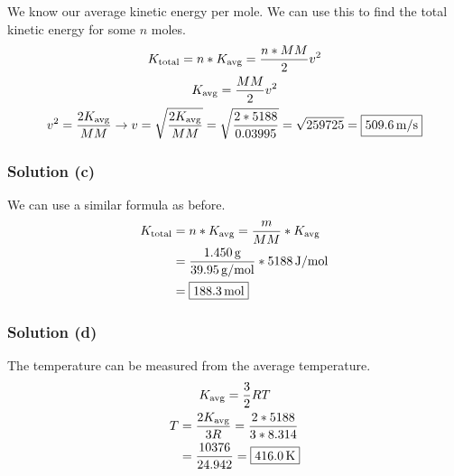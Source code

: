 \documentclass[10pt]{article}
\begin{document}
                We know our average kinetic energy per mole.
                We can use this to find the total kinetic energy for some $n$ moles.
                \begin{gather}
                    K_{\rm total}   =   n * K_{\rm avg}
                        =   \frac{n * MM}{2}v^2\\
                    K_{\rm avg} =   \frac{MM}{2}v^2\\
                    v^2 =   \frac{2K_{\rm avg}}{MM}   \to
                    v   =   \sqrt{\frac{2K_{\rm avg}}{MM}}
                        =   \sqrt{\frac{2 * 5188}{0.03995}}
                        =   \sqrt{259725}
                        =   \boxed{509.6\,\unit{\meter/\second}}
                \end{gather}
            
            \subsubsection{Solution (c)}
                We can use a similar formula as before. 
                \begin{align}
                    K_{\rm total}   &=  n * K_{\rm avg}
                        =   \frac{m}{MM} * K_{\rm avg}\\
                        &=  \frac{1.450\,\unit{\gram}}{39.95\,\unit{\gram/\mole}} * 5188\,\unit{\joule/\mole}\\
                        &=  \boxed{188.3\,\unit{\mole}}
                \end{align}

            \subsubsection{Solution (d)}
                The temperature can be measured from the average temperature. 
                \begin{gather}
                    K_{\rm avg} =   \frac{3}{2} RT\\
                    \begin{align}
                        T   &=  \frac{2K_{\rm avg}}{3R}
                            =   \frac{2 * 5188}{3 * 8.314}\\
                            &=  \frac{10376}{24.942}
                            =   \boxed{416.0\,\unit{\kelvin}}
                    \end{align}
                \end{gather}
\end{document}
